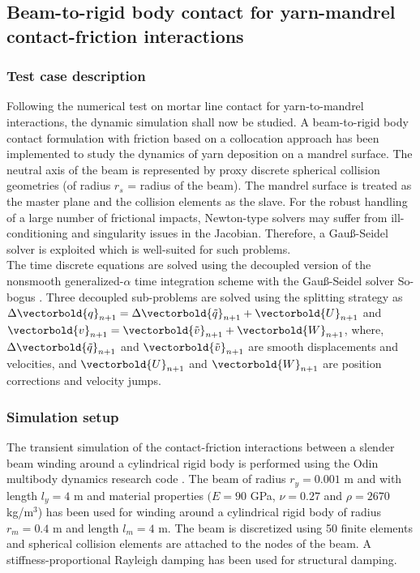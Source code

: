 \subsection{Beam-to-rigid body contact for yarn-mandrel contact-friction interactions}
\subsubsection{Test case description}
Following the numerical test on mortar line contact for yarn-to-mandrel interactions, the dynamic simulation shall now be studied. A beam-to-rigid body contact formulation with friction based on a collocation approach has been implemented to study the dynamics of yarn deposition on a mandrel surface. The neutral axis of the beam is represented by proxy discrete spherical collision geometries \cite{tasora2020geometrically} (of radius $r_s$ = radius of the beam). The mandrel surface is treated as the master plane and the collision elements as the slave. For the robust handling of a large number of frictional impacts, Newton-type solvers may suffer from ill-conditioning and singularity issues in the Jacobian. Therefore, a Gau{\ss}-Seidel solver is exploited which is well-suited for such problems.\\

The time discrete equations are solved using the decoupled version of the nonsmooth generalized-$\alpha$ time integration scheme \cite{cosimo2020robust} with the Gau{\ss}-Seidel solver So-bogus \cite{daviet2011hybrid}. Three decoupled sub-problems are solved using the splitting strategy as $\Delta \vectorbold{q}_{n+1} = \Delta \vectorbold{\Tilde{q}}_{n+1} + \vectorbold{U}_{n+1}$ and $\vectorbold{v}_{n+1} = \vectorbold{\Tilde{v}}_{n+1} + \vectorbold{W}_{n+1}$, where, $\Delta \vectorbold{\Tilde{q}}_{n+1}$ and $\vectorbold{\Tilde{v}}_{n+1}$ are smooth displacements and velocities, and $\vectorbold{U}_{n+1}$ and $\vectorbold{W}_{n+1}$ are position corrections and velocity jumps. 

\subsubsection{Simulation setup}
The transient simulation of the contact-friction interactions between a slender beam winding around a cylindrical rigid body is performed using the Odin multibody dynamics research code \cite{odin2022}. The beam of radius $r_y = 0.001$ m and with length $l_y = 4$ m and material properties $(E = 90$ GPa, $\nu = 0.27$ and $\rho = 2670$ kg/m$^3$) has been used for winding around a cylindrical rigid body of radius  $r_m = 0.4$ m and length $l_m = 4$ m. The beam is discretized using 50 finite elements and spherical collision elements are attached to the nodes of the beam. A stiffness-proportional Rayleigh damping has been used for structural damping. \\
 


